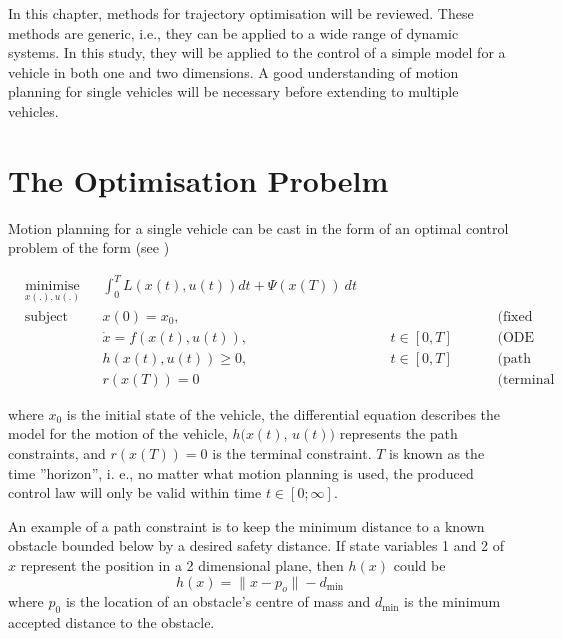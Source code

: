 %
\cleardoublepage%
\label{chap:theory}
 
\par In this chapter, methods for trajectory optimisation will be reviewed. These methods are generic, i.e., they can be applied to a wide range of dynamic systems. In this study, they will be applied to the control of a simple model for a vehicle in both one and two dimensions. A good understanding of motion planning for single vehicles will be necessary before extending to multiple vehicles.

\section{The Optimisation Probelm}

\par Motion planning for a single vehicle can be cast in the form of an optimal control problem of the form (see \cite{diehl2006fast})

\begin{equation}
    \begin{aligned}
    & \underset{x(.),u(.)}{\text{minimise}} && \int_0^T L(x(t),u(t))dt + \Psi (x(T)) \ dt\\
    & \text{subject to}  && x(0) = x_0, &&& &&&& \text{(fixed initial value)} \\
        & && \dot{x} = f(x(t), u(t)), &&& t \in [0,T] &&&& \text{(ODE Model)}\\
        & && h(x(t),u(t)) \geq 0, &&&  t \in [0,T] &&&& \text{(path constraints)} &&&&&\\
        & && r(x(T)) = 0 &&& &&&& \text{(terminal constraints)} &&&&&
    \end{aligned}
    \label{eq:general_cost}
\end{equation}

where $x_0$ is the initial state of the vehicle, the differential equation describes the model for the motion of the vehicle, $h(x(t)$, $u(t))$ represents the path constraints, and $r(x(T))=0$ is the terminal constraint. $T$ is known as the time ”horizon”, i. e., no matter what motion planning is used, the produced control law will only be valid within time $t\in[0;\infty]$.


\par An example of a path constraint is to keep the minimum distance to a known obstacle bounded below by a desired safety distance. If state variables 1 and 2 of $x$ represent the position in a 2 dimensional plane, then $h(x)$ could be
\begin{equation}
    \label{eq:example_constr}
    h(x) = \lVert x - p_o \rVert - d_{\text{min}}
\end{equation}
where $p_0$ is the location of an obstacle's centre of mass and $d_{\text{min}}$ is the minimum accepted distance to the obstacle.

